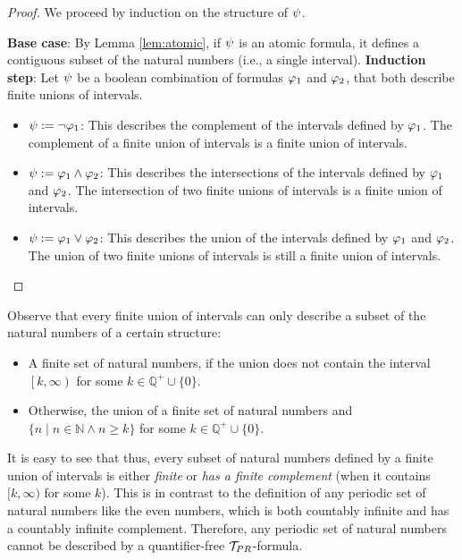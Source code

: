 \begin{proof}
  We proceed by induction on the structure of $\psi$.

  \textbf{Base case}: By Lemma \ref{lem:atomic}, if $\psi$ is an atomic formula,
  it defines a contiguous subset of the natural numbers (i.e., a single
  interval).
  \textbf{Induction step}: Let $\psi$ be a boolean combination of formulas
  $\varphi_1$ and $\varphi_2$, that both describe finite unions of intervals.
  \begin{itemize}
    \item $\psi := \neg \varphi_1$: This describes the complement of the intervals defined by $\varphi_1$.
      The complement of a finite union of intervals is a finite union of intervals.
    \item $\psi := \varphi_1 \land \varphi_2$: This describes the intersections of the intervals defined by $\varphi_1$ and $\varphi_2$.
      The intersection of two finite unions of intervals is a finite union of intervals.
    \item $\psi := \varphi_1 \lor \varphi_2$: This describes the union of the intervals defined by $\varphi_1$ and $\varphi_2$.
      The union of two finite unions of intervals is still a finite union of intervals.
  \end{itemize}
\end{proof}

Observe that every finite union of intervals can only describe a subset of the natural numbers of
a certain structure:

\begin{itemize}
  \item A finite set of natural numbers, if the union does not contain the interval $\left[k, \infty\right)$ for some $k \in \mathbb Q^{+} \cup \{0\}$.
  \item Otherwise, the union of a finite set of natural numbers and $\{n \mid n \in \mathbb N \land n \geq k \}$ for some $k \in \mathbb Q^{+} \cup \{0\}$.
\end{itemize}

It is easy to see that thus, every subset of natural numbers defined by a finite
union of intervals is either \emph{finite} or \emph{has a finite complement} (when it contains
$[k, \infty)$ for some $k$).  This is in contrast to the definition of any
periodic set of natural numbers like the even numbers, which is both countably
infinite and has a countably infinite complement. Therefore, any periodic
set of natural numbers cannot be described by a quantifier-free $\mathcal{T}_{PR}$-formula.
